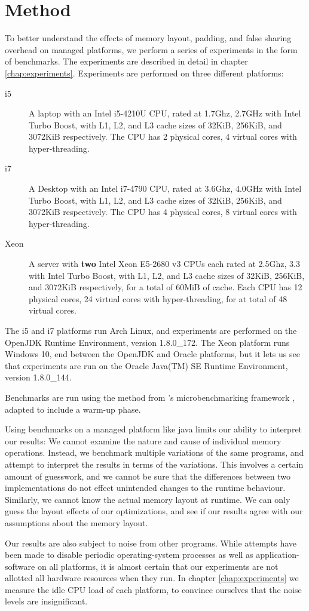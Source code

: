 \chapter{Method}
\label{chap:method}
To better understand the effects of memory layout, padding, and false sharing
overhead on managed platforms, we perform a series of experiments in the form of
benchmarks. The experiments are described in detail in chapter
\ref{chap:experiments}. Experiments are performed on three different platforms:

\begin{description}
\item [i5] A laptop with an Intel i5-4210U CPU, rated at 1.7Ghz, 2.7GHz with Intel
Turbo Boost, with L1, L2, and L3 cache sizes of 32KiB, 256KiB, and 3072KiB
respectively. The CPU has 2 physical cores, 4 virtual cores with
hyper-threading.
\item [i7] A Desktop with an Intel i7-4790 CPU, rated at 3.6Ghz, 4.0GHz with Intel
Turbo Boost, with L1, L2, and L3 cache sizes of 32KiB, 256KiB, and 3072KiB
respectively. The CPU has 4 physical cores, 8 virtual cores with
hyper-threading.
\item [Xeon] A server with \textbf{two} Intel Xeon E5-2680 v3 CPUs each rated at
2.5Ghz, 3.3 with Intel Turbo Boost, with L1, L2, and L3 cache sizes of 32KiB,
256KiB, and 3072KiB respectively, for a total of 60MiB of cache. Each CPU has 12
physical cores, 24 virtual cores with hyper-threading, for at total of 48 virtual cores.
\end{description}

The i5 and i7 platforms run Arch Linux, and experiments are performed on the OpenJDK
Runtime Environment, version 1.8.0\_172. The Xeon platform runs Windows 10, end
between the OpenJDK and Oracle platforms, but it lets us see that 
experiments are run on the Oracle Java(TM) SE Runtime Environment, version
1.8.0\_144.

Benchmarks are run using the  method from \citeauthor{microbmarks}'s
microbenchmarking framework \cite{microbmarks}, adapted to include a warm-up
phase.

Using benchmarks on a managed platform like java limits our ability to interpret
our results: We cannot examine the nature and cause of individual memory
operations. Instead, we benchmark multiple variations of the same programs, and
attempt to interpret the results in terms of the variations. This involves a
certain amount of guesswork, and we cannot be sure that the differences between
two implementations do not effect unintended changes to the runtime behaviour.
Similarly, we cannot know the actual memory layout at runtime. We can only guess
the layout effects of our optimizations, and see if our results agree
with our assumptions about the memory layout.

Our results are also subject to noise from other programs. While attempts have
been made to disable periodic operating-system processes as well as
application-software on all platforms, it is almost certain that our experiments
are not allotted all hardware resources when they run. In chapter
\ref{chap:experiments} we measure the idle CPU load of each platform, to
convince ourselves that the noise levels are insignificant.

